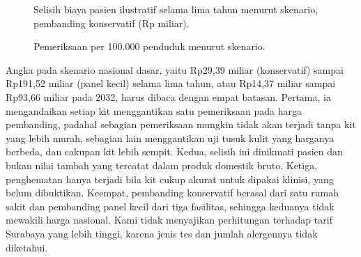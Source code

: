 \documentclass[11pt,a4paper]{article}
\begin{document}
\begin{figure}[htbp]
\centering
{}
\caption{Selisih biaya pasien ilustratif selama lima tahun menurut skenario, pembanding konservatif (Rp miliar).}
\label{fig:sav}
\end{figure}

\begin{figure}[htbp]
\centering
{}
\caption{Pemeriksaan per 100.000 penduduk menurut skenario.}
\label{fig:p100k}
\end{figure}

Angka pada skenario nasional dasar, yaitu Rp29,39 miliar (konservatif) sampai Rp191,52 miliar (panel kecil) selama lima tahun, atau Rp14,37 miliar sampai Rp93,66 miliar pada 2032, harus dibaca dengan empat batasan. Pertama, ia mengandaikan setiap kit menggantikan satu pemeriksaan pada harga pembanding, padahal sebagian pemeriksaan mungkin tidak akan terjadi tanpa kit yang lebih murah, sebagian lain menggantikan uji tusuk kulit yang harganya berbeda, dan cakupan kit lebih sempit. Kedua, selisih ini dinikmati pasien dan bukan nilai tambah yang tercatat dalam produk domestik bruto. Ketiga, penghematan hanya terjadi bila kit cukup akurat untuk dipakai klinisi, yang belum dibuktikan. Keempat, pembanding konservatif berasal dari satu rumah sakit dan pembanding panel kecil dari tiga fasilitas, sehingga keduanya tidak mewakili harga nasional. Kami tidak menyajikan perhitungan terhadap tarif Surabaya yang lebih tinggi, karena jenis tes dan jumlah alergennya tidak diketahui.
\end{document}
